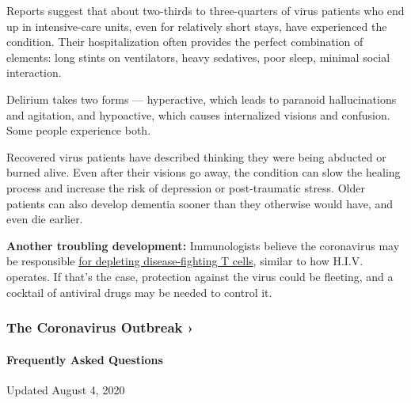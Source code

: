 Reports suggest that about two-thirds to three-quarters of virus
patients who end up in intensive-care units, even for relatively short
stays, have experienced the condition. Their hospitalization often
provides the perfect combination of elements: long stints on
ventilators, heavy sedatives, poor sleep, minimal social interaction.

Delirium takes two forms --- hyperactive, which leads to paranoid
hallucinations and agitation, and hypoactive, which causes internalized
visions and confusion. Some people experience both.

Recovered virus patients have described thinking they were being
abducted or burned alive. Even after their visions go away, the
condition can slow the healing process and increase the risk of
depression or post-traumatic stress. Older patients can also develop
dementia sooner than they otherwise would have, and even die earlier.

\textbf{Another troubling development:} Immunologists believe the
coronavirus may be responsible
\href{https://www.nytimes.com/2020/06/26/health/coronavirus-immune-system.html}{for
depleting disease-fighting T cells}, similar to how H.I.V. operates. If
that's the case, protection against the virus could be fleeting, and a
cocktail of antiviral drugs may be needed to control it.

\href{https://www.nytimes.com/news-event/coronavirus?action=click\&pgtype=Article\&state=default\&region=MAIN_CONTENT_3\&context=storylines_faq}{}

\hypertarget{the-coronavirus-outbreak-}{%
\subsubsection{The Coronavirus Outbreak
›}\label{the-coronavirus-outbreak-}}

\hypertarget{frequently-asked-questions}{%
\paragraph{Frequently Asked
Questions}\label{frequently-asked-questions}}

Updated August 4, 2020

